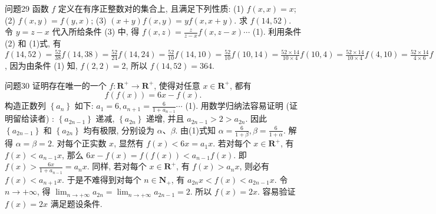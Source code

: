 问题29 函数 $f$ 定义在有序正整数对的集合上, 且满足下列性质:
(1) $f(x, x)=x$;
(2) $f(x, y)=f(y, x)$;
(3) $(x+y) f(x, y)=y f(x, x+y)$.
求 $f(14,52)$.
令 $y=z-x$ 代入所给条件 (3) 中, 得 $f(x, z)=\frac{z}{z-x} f(x, z-x) \cdots$ (1). 利用条件 (2) 和 (1)式, 有 $f(14,52)=\frac{52}{38} f(14,38)=\frac{52}{24} f(14,24)= \frac{52}{10} f(14,10)=\frac{52}{10} f(10,14)=\frac{52 \times 14}{10 \times 4} f(10,4)=\frac{52 \times 14}{10 \times 4} f(4,10)= \frac{52 \times 14}{4 \times 6} f(4,6)=\frac{52 \times 14}{4 \times 2} f(4,2)=\frac{52 \times 14}{4 \times 2} f(2,4)=\frac{52 \times 14}{4} f(2,2)$, 因为由条件 (1) 知, $f(2,2)=2$, 所以 $f(14,52)=364$.



问题30 证明存在唯一的一个 $f: \mathbf{R}^{+} \rightarrow \mathbf{R}^{+}$, 使得对任意 $x \in \mathbf{R}^{+}$, 都有
$$
f(f(x))=6 x-f(x) .
$$
构造正数列 $\left\{a_n\right\}$ 如下: $a_1=6, a_{n+1}=\frac{6}{1+a_{n-1}} \cdots$ (1). 用数学归纳法容易证明 (证明留给读者) : $\left\{a_{2 n-1}\right\}$ 递减, $\left\{a_{2 n}\right\}$ 递增, 并且 $a_{2 n-1}>2>a_{2 n}$. 因此 $\left\{a_{2 n-1}\right\}$ 和 $\left\{a_{2 n}\right\}$ 均有极限, 分别设为 $\alpha 、 \beta$. 由(1)式知 $\alpha=\frac{6}{1+\beta}, \beta=\frac{6}{1+\alpha}$. 解得 $\alpha=\beta=2$. 对每个正实数 $x$, 显然有 $f(x)<6 x=a_1 x$. 若对每个 $x \in \mathbf{R}^{+}$, 有 $f(x)<a_{n-1} x$, 那么 $6 x-f(x)=f(f(x))<a_{n-1} f(x)$. 即 $f(x)>\frac{6 x}{1+a_{n-1}}=a_n x$. 同样, 若对每个 $x \in \mathbf{R}^{+}$, 有 $f(x)>a_n x$, 则必有 $f(x)<a_{n+1} x$. 于是不难得到对每个 $n \in \mathbf{N}_{+}$, 有 $a_{2 n} x<f(x)<a_{2 n-1} x$. 令 $n \rightarrow+\infty$, 得 $\lim _{n \rightarrow+\infty} a_{2 n}= \lim _{n \rightarrow+\infty} a_{2 n-1}=2$. 所以 $f(x)=2 x$. 容易验证 $f(x)=2 x$ 满足题设条件.



